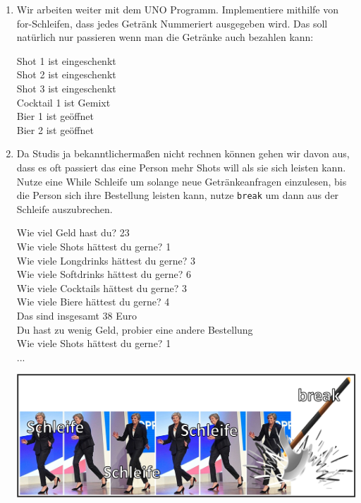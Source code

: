 \documentclass{../../sheet}
\begin{document}
\newpage
{}
\begin{enumerate}
    \item Wir arbeiten weiter mit dem UNO Programm. Implementiere mithilfe von for-Schleifen, dass jedes Getränk Nummeriert ausgegeben wird. Das soll natürlich nur passieren wenn man die Getränke auch bezahlen kann:
          \begin{ausgabe}
              Shot 1 ist  eingeschenkt\\
              Shot 2 ist  eingeschenkt\\
              Shot 3 ist  eingeschenkt\\
              Cocktail 1 ist  Gemixt\\
              Bier 1 ist geöffnet\\
              Bier 2 ist geöffnet
          \end{ausgabe}
    \item Da Studis ja bekanntlichermaßen nicht rechnen können gehen wir davon aus, dass es oft passiert das eine Person mehr Shots will als sie sich leisten kann. Nutze eine While Schleife um solange neue Getränkeanfragen einzulesen, bis die Person sich ihre Bestellung leisten kann, nutze \texttt{break} um dann aus der Schleife auszubrechen.
    \begin{ausgabe}
        Wie viel Geld hast du? 23\\
        Wie viele Shots hättest du gerne? 1\\
        Wie viele Longdrinks hättest du gerne? 3\\
        Wie viele Softdrinks hättest du gerne? 6\\
        Wie viele Cocktails hättest du gerne? 3\\
        Wie viele Biere hättest du gerne? 4\\
        Das sind insgesamt 38 Euro\\
        Du hast zu wenig Geld, probier eine andere Bestellung\\
        Wie viele Shots hättest du gerne? 1\\
        ...
    \end{ausgabe}

    \includegraphics[width=1\linewidth]{../../memes/break.png}
    

\end{enumerate}
\end{document}
